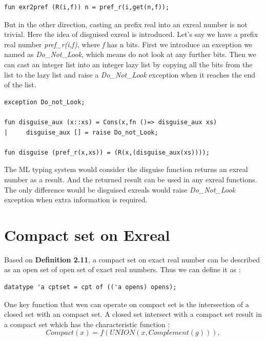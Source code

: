 \documentclass[12pt,twoside,notitlepage]{report}
\begin{document}
{
\begin{verbatim}
fun exr2pref (R(i,f)) n = pref_r(i,get(n,f));
\end{verbatim}
}

But in the other direction, casting an prefix real into an exreal number is not trivial. Here the idea of disguised exreal is introduced. Let's say we have a prefix real number \textit{pref\_r(i,f)}, where \textit{f} has n bits. First we introduce an exception we named as \textit{Do\_Not\_Look}, which means do not look at any further bits. Then we can cast an integer list into an integer lazy list by copying all the bits from the list to the lazy list and raise a \textit{Do\_Not\_Look} exception when it reaches the end of the list.

{
\begin{verbatim}
exception Do_not_Look;

fun disguise_aux (x::xs) = Cons(x,fn ()=> disguise_aux xs)
|     disguise_aux [] = raise Do_not_Look;

fun disguise (pref_r(x,xs)) = (R(x,(disguise_aux(xs))));
\end{verbatim}
}

The ML typing system would consider the disguise function returns an exreal number as a result. And the returned result can be used in any exreal functions. The only difference would be disguised exreals would raise \textit{Do\_Not\_Look} exception when extra information is required.


\section{Compact set on Exreal}
Based on \textbf{Definition 2.11}, a compact set on exact real number can be described as an open set of open set of exact real numbers. Thus we can define it as :\\

{
\begin{verbatim}
datatype 'a cptset = cpt of (('a opens) opens);
\end{verbatim}
}

One key function that wen can operate on compact set is the intersection of a closed set with an compact set. A closed set intersect with a compact set result in a compact set which has the characteristic function \cite{pauly-synthetic-arxiv} :
\begin{equation}
Compact(x) = f(UNION(x,Complement(g))), 
\end{equation}
\end{document}
